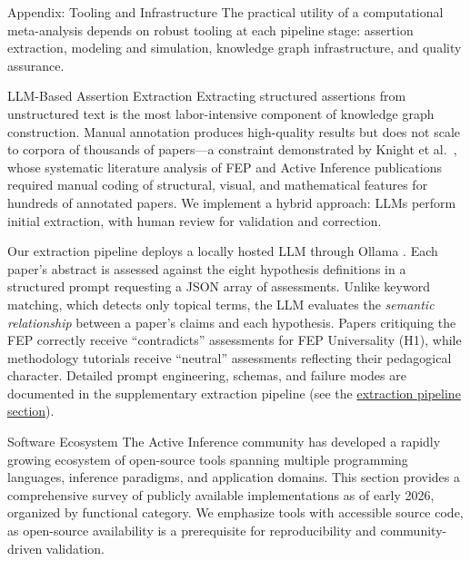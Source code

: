 \documentclass[
  ignorenonframetext,
]{beamer}
\author{\texorpdfstring{}{}}
\date{}
\begin{document}
\begin{frame}[fragile]{Appendix: Tooling and Infrastructure
\label{sec:tooling}}
\protect{}\label{appendix-tooling-and-infrastructure}
The practical utility of a computational meta-analysis depends on robust
tooling at each pipeline stage: assertion extraction, modeling and
simulation, knowledge graph infrastructure, and quality assurance.

\begin{block}{LLM-Based Assertion Extraction}
\protect{}\label{llm-based-assertion-extraction}
Extracting structured assertions from unstructured text is the most
labor-intensive component of knowledge graph construction. Manual
annotation produces high-quality results but does not scale to corpora
of thousands of papers---a constraint demonstrated by Knight et
al.~\citep{knight2022fep}, whose systematic literature analysis of FEP
and Active Inference publications required manual coding of structural,
visual, and mathematical features for hundreds of annotated papers. We
implement a hybrid approach: LLMs perform initial extraction, with human
review for validation and correction.

Our extraction pipeline deploys a locally hosted LLM through Ollama
\citep{ollama2024}. Each paper's abstract is assessed against the eight
hypothesis definitions in a structured prompt requesting a JSON array of
assessments. Unlike keyword matching, which detects only topical terms,
the LLM evaluates the \emph{semantic relationship} between a paper's
claims and each hypothesis. Papers critiquing the FEP correctly receive
``contradicts'' assessments for FEP Universality (H1), while methodology
tutorials receive ``neutral'' assessments reflecting their pedagogical
character. Detailed prompt engineering, schemas, and failure modes are
documented in the supplementary extraction pipeline (see the
\hyperref[sec:extraction_pipeline]{extraction pipeline section}).
\end{block}

\begin{block}{Software Ecosystem}
\protect{}\label{software-ecosystem}
The Active Inference community has developed a rapidly growing ecosystem
of open-source tools spanning multiple programming languages, inference
paradigms, and application domains. This section provides a
comprehensive survey of publicly available implementations as of early
2026, organized by functional category. We emphasize tools with
accessible source code, as open-source availability is a prerequisite
for reproducibility and community-driven validation.


\end{block}
\end{frame}
\end{document}
